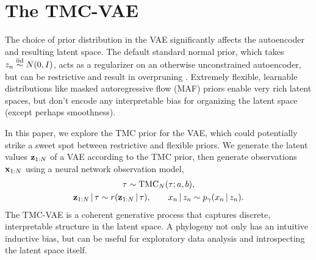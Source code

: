 \section{The TMC-VAE}
\label{sec:tmc-vae}

The choice of prior distribution in the VAE significantly affects the autoencoder and resulting latent space.
The default standard normal prior, which takes $z_n \stackrel{\mathrm{iid}}{\sim} N(0, I)$, acts as a regularizer on an otherwise unconstrained autoencoder, but can be restrictive and result in overpruning \citep{Burda2015}.
Extremely flexible, learnable distributions like masked autoregressive flow (MAF) priors \citep{Papamakarios2017} enable very rich latent spaces, but don't encode any interpretable bias for organizing the latent space (except perhaps smoothness).

In this paper, we explore the TMC prior for the VAE, which could potentially strike a sweet spot between restrictive and flexible priors.
We generate the latent values $\mathbf{z}_{1:N}$ of a VAE according to the TMC prior, then generate observations $\mathbf{x}_{1:N}$ using a neural network observation model,
\begin{gather}
        \tau \sim \mathrm{TMC}_N(\tau; a, b), \\
        \mathbf{z}_{1:N} \,|\, \tau \sim r(\mathbf{z}_{1:N} \,|\, \tau),
        \qquad
        x_n \,|\, z_n \sim p_\gamma(x_n \,|\, z_n).
\end{gather}
The TMC-VAE is a coherent
generative process that captures
discrete, interpretable structure in the latent space.
A phylogeny not only has an intuitive inductive bias,
but can be useful for
exploratory data analysis
and introspecting the latent space itself.

